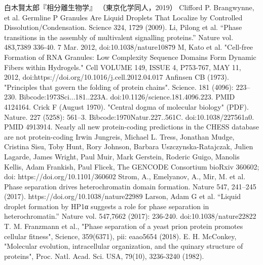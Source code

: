 \documentclass[uplatex, dvipdfmx]{jsreport}
\begin{document}
\begin{thebibliography}{99}
        白木賢太郎『相分離生物学』
        （東京化学同人，2019）
        Clifford P. Brangwynne, et al. Germline P Granules Are Liquid Droplets That Localize by Controlled Dissolution/Condensation. Science 324, 1729 (2009).
        Li, Pilong et al. “Phase transitions in the assembly of multivalent signalling proteins.” Nature vol. 483,7389 336-40. 7 Mar. 2012, doi:10.1038/nature10879
        M, Kato et al. "Cell-free Formation of RNA Granules: Low Complexity Sequence Domains Form Dynamic Fibers within Hydrogels." Cell VOLUME 149, ISSUE 4, P753-767, MAY 11, 2012, doi:https://doi.org/10.1016/j.cell.2012.04.017
        Anfinsen CB (1973). "Principles that govern the folding of protein chains". Science. 181 (4096): 223–230. Bibcode:1973Sci...181..223A. doi:10.1126/science.181.4096.223. PMID 4124164.
        Crick F (August 1970). "Central dogma of molecular biology" (PDF). Nature. 227 (5258): 561–3. Bibcode:1970Natur.227..561C. doi:10.1038/227561a0. PMID 4913914.
        Nearly all new protein-coding predictions in the CHESS database are not protein-coding
        Irwin Jungreis, Michael L. Tress, Jonathan Mudge, Cristina Sisu, Toby Hunt, Rory Johnson, Barbara Uszczynska-Ratajczak, Julien Lagarde, James Wright, Paul Muir, Mark Gerstein, Roderic Guigo, Manolis Kellis, Adam Frankish, Paul Flicek, The GENCODE Consortium
        bioRxiv 360602; doi: https://doi.org/10.1101/360602
        Strom, A., Emelyanov, A., Mir, M. et al. Phase separation drives heterochromatin domain formation. Nature 547, 241–245 (2017). https://doi.org/10.1038/nature22989
        Larson, Adam G et al. “Liquid droplet formation by HP1α suggests a role for phase separation in heterochromatin.” Nature vol. 547,7662 (2017): 236-240. doi:10.1038/nature22822
        T. M. Franzmann et al., "Phase separation of a yeast prion protein promotes cellular fitness", Science, 359(6371), pii: eaao5654 (2018).
        E. H. McConkey, "Molecular evolution, intracellular organization, and the quinary structure of proteins", Proc. Natl. Acad. Sci. USA, 79(10), 3236-3240 (1982).
\end{thebibliography}
\end{document}
